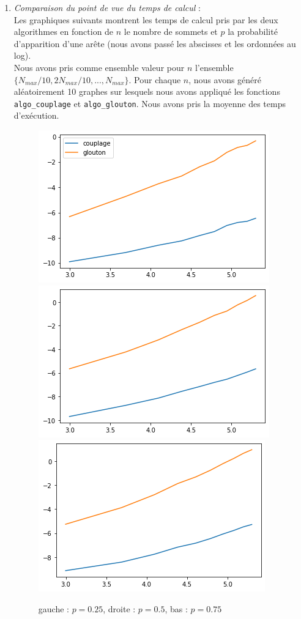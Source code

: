 \documentclass[12pt]{article}
\begin{document}
        \begin{enumerate}
            \item \textit{Comparaison du point de vue du temps de calcul} : \\
                Les graphiques suivants montrent les temps de calcul pris par les deux algorithmes en fonction de $n$ le nombre de sommets et $p$ la probabilité d'apparition d'une arête (nous avons passé les abscisses et les ordonnées au log). \\
                Nous avons pris comme ensemble valeur pour $n$ l'ensemble $\{N_{max}/10, 2N_{max}/10,..., N_{max}\}$. Pour chaque $n$, nous avons généré aléatoirement 10 graphes sur lesquels nous avons appliqué les fonctions \texttt{algo\_couplage} et \texttt{algo\_glouton}. Nous avons pris la moyenne des temps d'exécution. \\

                \begin{figure}[h]
                    \caption{gauche : $p=0.25$, droite : $p=0.5$, bas : $p=0.75$}
                    \includegraphics[scale=0.5]{figures/tps_exec_couglou25.png}
                    \includegraphics[scale=0.5]{figures/tps_exec_couglou5.png}
                    \includegraphics[scale=0.5]{figures/tps_exec_couglou75.png}
                    \centering
                \end{figure}


\end{enumerate}
\end{document}
